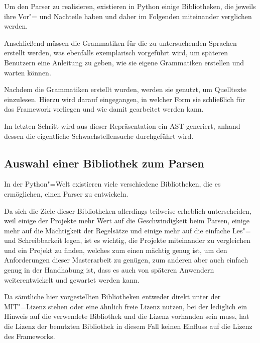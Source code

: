         Um den Parser zu realisieren,
        existieren in Python einige Bibliotheken,
        die jeweils ihre Vor"= und
        Nachteile haben und
        daher im Folgenden miteinander verglichen werden.

        Anschließend müssen die Grammatiken für die zu untersuchenden Sprachen erstellt werden,
        was ebenfalls exemplarisch vorgeführt wird,
        um späteren Benutzern eine Anleitung zu geben,
        wie sie eigene Grammatiken erstellen und
        warten können.

        Nachdem die Grammatiken erstellt wurden,
        werden sie genutzt,
        um Quelltexte einzulesen.
        Hierzu wird darauf eingegangen,
        in welcher Form sie schließlich für das Framework vorliegen und
        wie damit gearbeitet werden kann.

        Im letzten Schritt wird aus dieser Repräsentation ein
        \gls{AST} generiert,
        anhand dessen die eigentliche Schwachstellensuche durchgeführt wird.

        \subsection{Auswahl einer Bibliothek zum Parsen}
            In der Python"=Welt existieren viele verschiedene Bibliotheken,
            die es ermöglichen,
            einen Parser zu entwickeln.

            Da sich die Ziele dieser Bibliotheken allerdings teilweise erheblich unterscheiden,
            weil einige der Projekte mehr Wert auf die Geschwindigkeit beim Parsen,
            einige mehr auf die Mächtigkeit der Regelsätze und
            einige mehr auf die einfache Les"= und
            Schreibbarkeit legen,
            ist es wichtig,
            die Projekte miteinander zu vergleichen und
            ein Projekt zu finden,
            welches zum einen mächtig genug ist,
            um den Anforderungen dieser Masterarbeit zu genügen,
            zum anderen aber auch einfach genug in der Handhabung ist,
            dass es auch von späteren Anwendern weiterentwickelt und
            gewartet werden kann.

            Da sämtliche hier vorgestellten Bibliotheken entweder direkt unter der
            \gls{MIT}"=Lizenz stehen oder
            eine ähnlich freie Lizenz nutzen,
            bei der lediglich ein Hinweis auf die verwendete Bibliothek und
            die Lizenz vorhanden sein muss,
            hat die Lizenz der benutzten Bibliothek in diesem Fall keinen Einfluss auf die Lizenz des Frameworks.

